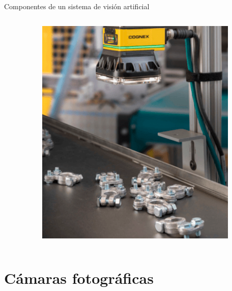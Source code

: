 \documentclass{if-beamer}
\begin{document}
\begin{frame}{Componentes de un sistema de visión artificial}
\begin{columns}
\begin{column}{0.5\textwidth}
\end{column}
\begin{column}{0.5\textwidth}  %
    \begin{center}
     \includegraphics[width=0.85\textwidth]{vision_artificial.png}
     \end{center}
\end{column}
\end{columns}

\end{frame}

\section{Cámaras fotográficas}
\end{document}
